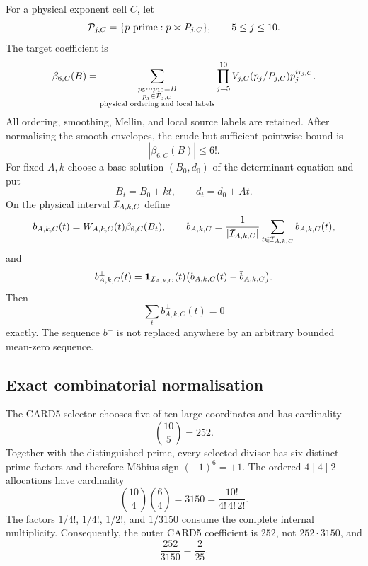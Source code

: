 For a physical exponent cell $C$, let
\[
 \mathcal P_{j,C}=\{p\ \text{prime}:p\asymp P_{j,C}\},
       \qquad 5\le j\le10.
\]
The target coefficient is
\begin{equation}\label{eq:beta6}
 \beta_{6,C}(B)=
 \sum_{\substack{p_5\cdots p_{10}=B\\
                   p_j\in\mathcal P_{j,C}\\
                   \text{physical ordering and local labels}}}
 \prod_{j=5}^{10}V_{j,C}(p_j/P_{j,C})p_j^{i\tau_{j,C}}.
\end{equation}
All ordering, smoothing, Mellin, and local source labels are retained.  After
normalising the smooth envelopes, the crude but sufficient pointwise bound is
\begin{equation}\label{eq:beta6-bound}
                     |\beta_{6,C}(B)|\le 6!.
\end{equation}
For fixed $A,k$ choose a base solution $(B_0,d_0)$ of the determinant equation
and put
\begin{equation}\label{eq:affine-def-early}
             B_t=B_0+kt,\qquad d_t=d_0+At.
\end{equation}
On the physical interval $\mathcal I_{A,k,C}$ define
\begin{equation}\label{eq:b-line}
 b_{A,k,C}(t)=W_{A,k,C}(t)\beta_{6,C}(B_t),
 \qquad
 \bar b_{A,k,C}=\frac1{|\mathcal I_{A,k,C}|}
       \sum_{t\in\mathcal I_{A,k,C}}b_{A,k,C}(t),
\end{equation}
and
\begin{equation}\label{eq:bperp}
 b^\perp_{A,k,C}(t)=\mathbf 1_{\mathcal I_{A,k,C}}(t)
       \bigl(b_{A,k,C}(t)-\bar b_{A,k,C}\bigr).
\end{equation}
Then
\begin{equation}\label{eq:mean-zero}
                    \sum_t b^\perp_{A,k,C}(t)=0
\end{equation}
exactly.  The sequence $b^\perp$ is not replaced anywhere by an arbitrary
bounded mean-zero sequence.

\subsection{Exact combinatorial normalisation}

\begin{proposition}\label{prop:normalisation}
The CARD5 selector chooses five of ten large coordinates and has cardinality
\[
                  \binom{10}{5}=252.
\]
Together with the distinguished prime, every selected divisor has six distinct
prime factors and therefore M\"obius sign $(-1)^6=+1$.  The ordered
$4\mid4\mid2$ allocations have cardinality
\[
  \binom{10}{4}\binom{6}{4}=3150
   =\frac{10!}{4!\,4!\,2!}.
\]
The factors $1/4!$, $1/4!$, $1/2!$, and $1/3150$ consume the complete internal
multiplicity.  Consequently, the outer CARD5 coefficient is $252$, not
$252\cdot3150$, and
\[
                    \frac{252}{3150}=\frac2{25}.
\]
\end{proposition}

